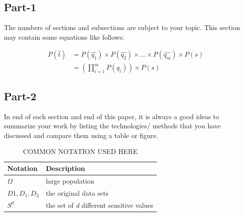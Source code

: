 \documentclass[conference]{sig-alternate}
\begin{document}
\subsection{Part-1}
The numbers of sections and subsections are subject to your topic. This section may contain some equations like follows:

\begin{align}
	P(\hat{t}) &= P(\hat{q_1})\times P(\hat{q_{2}})\times ...\times P(\hat{q_{m}})\times P(s) \nonumber \\
&= (\prod_{i=1}^{m} P(\hat{q_{i}}))\times P(s)
\end{align}

\subsection{Part-2}
In end of each section and end of this paper, it is always a
good ideas to summarize your work by listing the technologies/
methods that you have discussed and compare them using
a table or figure.

\begin{table}[h]
\begin{center}
	\caption{COMMON NOTATION USED HERE}
	\label{notation}
	\begin{tabular}{ |l|l| } 
		\hline
		\textbf{Notation} & \textbf{Description}  \\ 
		\hline
		$\Omega$ & large population \\
		\hline 
		$D1, D_{1}, D_{2}$ & the original data sets\\
		\hline
		$ S^{d} $ & the set of \textit{d} different sensitive values\\
		\hline
		
	\end{tabular}
\end{center}
\end{table}

\vfill\null
\end{document}
